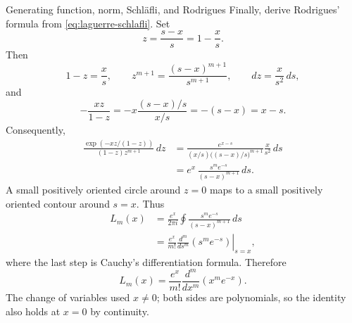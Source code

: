 \documentclass[11pt]{beamer}
\begin{document}
\begin{frame}[allowframebreaks]{Generating function, norm, Schl\"afli, and Rodrigues}
\medskip
Finally, derive Rodrigues' formula from
\eqref{eq:laguerre-schlafli}.  Set
\[
  z=\frac{s-x}{s}=1-\frac{x}{s}.
\]
Then
\[
  1-z=\frac{x}{s},
  \qquad
  z^{m+1}=\frac{(s-x)^{m+1}}{s^{m+1}},
  \qquad
  dz=\frac{x}{s^2}\,ds,
\]
and
\[
  -\frac{xz}{1-z}
   =-x
     \frac{(s-x)/s}{x/s}
   =-(s-x)
   =x-s.
\]
Consequently,
\begin{align*}
  \frac{\exp\!\left(-xz/(1-z)\right)}
       {(1-z)z^{m+1}}\,dz
   &=
    \frac{e^{x-s}}
         {(x/s)\bigl((s-x)/s\bigr)^{m+1}}
    \frac{x}{s^2}\,ds\\
   &=
    e^x\,
    \frac{s^m e^{-s}}{(s-x)^{m+1}}\,ds.
\end{align*}
A small positively oriented circle around $z=0$ maps to a small positively
oriented contour around $s=x$.  Thus
\begin{align*}
  L_m(x)
   &=
    \frac{e^x}{2\pi i}
    \oint
      \frac{s^m e^{-s}}{(s-x)^{m+1}}\,ds\\
   &=
    \frac{e^x}{m!}
    \left.
      \frac{d^m}{ds^m}\left(s^m e^{-s}\right)
    \right|_{s=x},
\end{align*}
where the last step is Cauchy's differentiation formula.  Therefore
\begin{equation}
  L_m(x)
    =\frac{e^x}{m!}
      \frac{d^m}{dx^m}\left(x^m e^{-x}\right).
  \label{eq:laguerre-rodrigues}
\end{equation}
The change of variables used $x\ne0$; both sides are polynomials, so the identity
also holds at $x=0$ by continuity.
\end{frame}
\end{document}
